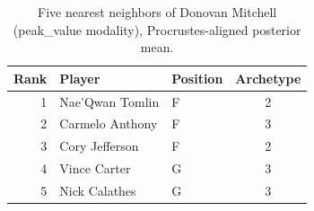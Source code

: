 \begin{table}[htbp]
  \centering\small
  \begin{tabular}{rllc}
    \toprule
    Rank & Player & Position & Archetype \\
    \midrule
    1 & Nae'Qwan Tomlin & F & 2 \\
    2 & Carmelo Anthony & F & 3 \\
    3 & Cory Jefferson & F & 2 \\
    4 & Vince Carter & G & 3 \\
    5 & Nick Calathes & G & 3 \\
    \bottomrule
  \end{tabular}
  \caption{Five nearest neighbors of Donovan Mitchell (peak_value modality), Procrustes-aligned posterior mean.}
  \label{tab:Donovan_Mitchell_neighbors_peak_value}
\end{table}

